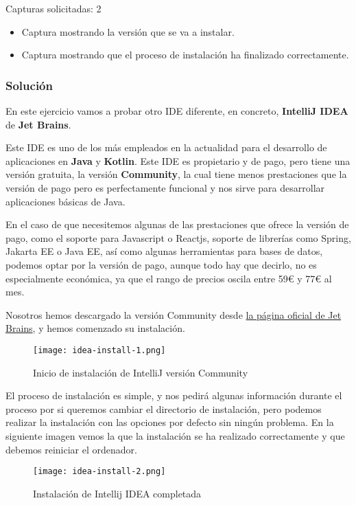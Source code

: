 Capturas solicitadas: 2
\begin{itemize}
    \item Captura mostrando la versión que se va a instalar.
    \item Captura mostrando que el proceso de instalación ha finalizado correctamente.
\end{itemize}

\subsubsection{Solución}
En este ejercicio vamos a probar otro IDE diferente, en concreto, \textbf{IntelliJ IDEA} de \textbf{Jet Brains}.

Este IDE es uno de los más empleados en la actualidad para el desarrollo de aplicaciones en \textbf{Java} y \textbf{Kotlin}. Este IDE es propietario y de pago, pero tiene una versión gratuita, la versión \textbf{Community}, la cual tiene menos prestaciones que la versión de pago pero es perfectamente funcional y nos sirve para desarrollar aplicaciones básicas de Java.

En el caso de que necesitemos algunas de las prestaciones que ofrece la versión de pago, como el soporte para Javascript o Reactjs, soporte de librerías como Spring, Jakarta EE o Java EE, así como algunas herramientas para bases de datos, podemos optar por la versión de pago, aunque todo hay que decirlo, no es especialmente económica, ya que el rango de precios oscila entre 59€ y 77€ al mes.

Nosotros hemos descargado la versión Community desde \href{https://www.jetbrains.com/idea/download/#section=windows}{la página oficial de Jet Brains}, y hemos comenzado su instalación.

\begin{figure}[ht]
    \centering
    \texttt{[image: idea-install-1.png]}
    \caption{Inicio de instalación de IntelliJ versión Community}
\end{figure}

El proceso de instalación es simple, y nos pedirá algunas información durante el proceso por si queremos cambiar el directorio de instalación, pero podemos realizar la instalación con las opciones por defecto sin ningún problema. En la siguiente imagen vemos la que la instalación se ha realizado correctamente y que debemos reiniciar el ordenador.

\begin{figure}[ht]
    \centering
    \texttt{[image: idea-install-2.png]}
    \caption{Instalación de Intellij IDEA completada}
\end{figure}

